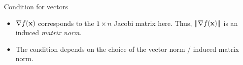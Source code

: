 \documentclass[11pt,compress,t,notes=noshow, xcolor=table]{beamer}
\begin{document}
\begin{vbframe}{Condition for vectors}
\begin{itemize}
\item $\nabla f(\mathbf{x})$ corresponds to the $1 \times n$ Jacobi matrix here. Thus, $\|\nabla f(\mathbf{x})\|$ is an induced \emph{matrix norm}.
\item The condition depends on the choice of the vector norm / induced matrix norm.
\end{itemize}


\end{vbframe}

%
%
%
%
%
%
\end{document}
